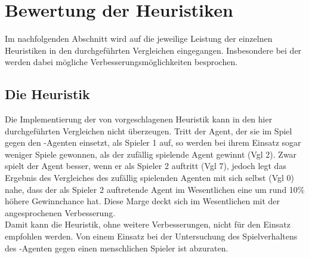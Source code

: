 \section{Bewertung der Heuristiken}
\label{sect:Fazit:Heuristiken}
Im nachfolgenden Abschnitt wird auf die jeweilige Leistung der einzelnen Heuristiken in den durchgeführten Vergleichen eingegangen. Insbesondere bei der  werden dabei mögliche Verbesserungsmöglichkeiten besprochen.  
\subsection{Die Heuristik }
Die Implementierung der von \cite{nijssen_2007} vorgeschlagenen Heuristik kann in den hier durchgeführten Vergleichen nicht überzeugen. Tritt der Agent, der sie im Spiel gegen den -Agenten einsetzt, als Spieler 1 auf, so werden bei ihrem Einsatz sogar weniger Spiele gewonnen, als der zufällig spielende Agent gewinnt (\ac{Vgl} 2). Zwar spielt der Agent besser, wenn er als Spieler 2 auftritt (\ac{Vgl} 7), jedoch legt das Ergebnis des Vergleiches des zufällig spielenden Agenten mit sich selbst (\ac{Vgl} 0) nahe, dass der als Spieler 2 auftretende Agent im Wesentlichen eine um rund 10\% höhere Gewinnchance hat. Diese Marge deckt sich im Wesentlichen mit der angesprochenen Verbesserung.
\\Damit kann die Heuristik, ohne weitere Verbesserungen, nicht für den Einsatz empfohlen werden. Von einem Einsatz bei der Untersuchung des Spielverhaltens des \mxZitat{\abp}-Agenten gegen einen menschlichen Spieler ist abzuraten. 
